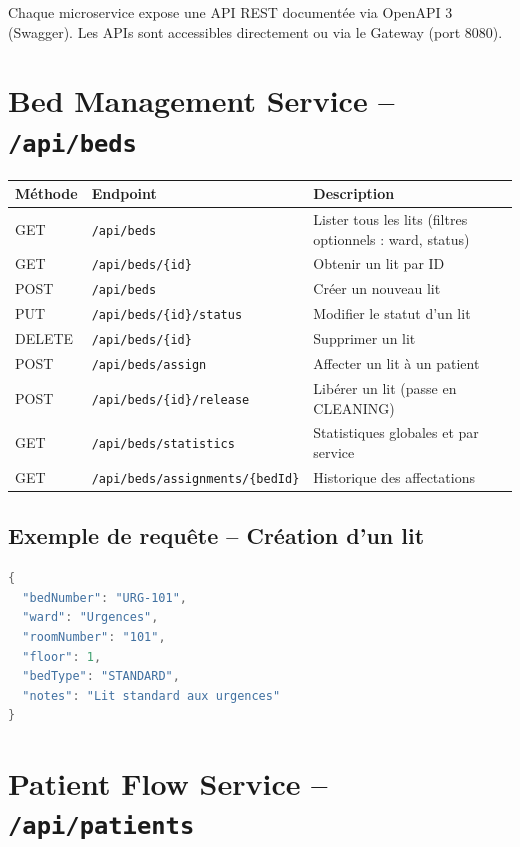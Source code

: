 \documentclass[12pt,a4paper]{report}
\begin{document}
Chaque microservice expose une API REST document\'ee via OpenAPI 3 (Swagger). Les APIs sont accessibles directement ou via le Gateway (port 8080).

\section{Bed Management Service -- \texttt{/api/beds}}

\begin{longtable}{llp{7cm}}
    \toprule
    \textbf{M\'ethode} & \textbf{Endpoint} & \textbf{Description} \\
    \midrule
    \endhead
    GET & \texttt{/api/beds} & Lister tous les lits (filtres optionnels : ward, status) \\
    GET & \texttt{/api/beds/\{id\}} & Obtenir un lit par ID \\
    POST & \texttt{/api/beds} & Cr\'eer un nouveau lit \\
    PUT & \texttt{/api/beds/\{id\}/status} & Modifier le statut d'un lit \\
    DELETE & \texttt{/api/beds/\{id\}} & Supprimer un lit \\
    POST & \texttt{/api/beds/assign} & Affecter un lit \`a un patient \\
    POST & \texttt{/api/beds/\{id\}/release} & Lib\'erer un lit (passe en CLEANING) \\
    GET & \texttt{/api/beds/statistics} & Statistiques globales et par service \\
    GET & \texttt{/api/beds/assignments/\{bedId\}} & Historique des affectations \\
    \bottomrule
\end{longtable}

\subsection{Exemple de requ\^ete -- Cr\'eation d'un lit}

\begin{lstlisting}[language=java, caption={POST /api/beds}]
{
  "bedNumber": "URG-101",
  "ward": "Urgences",
  "roomNumber": "101",
  "floor": 1,
  "bedType": "STANDARD",
  "notes": "Lit standard aux urgences"
}
\end{lstlisting}

\section{Patient Flow Service -- \texttt{/api/patients}}
\end{document}
